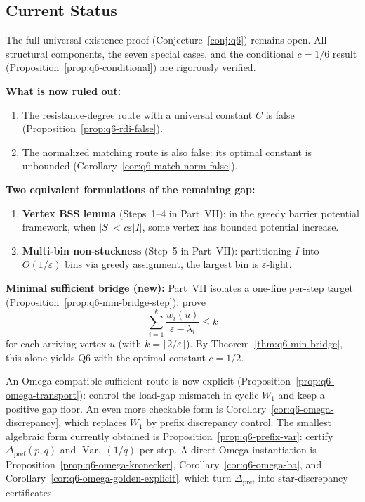 \subsection*{Current Status}
The full universal existence proof (Conjecture~\ref{conj:q6}) remains open.
All structural components, the seven special cases, and the
conditional $c=1/6$ result (Proposition~\ref{prop:q6-conditional})
are rigorously verified.

\medskip\noindent
\textbf{What is now ruled out:}
\begin{enumerate}[nosep]
\item The resistance-degree route with a universal constant
$C$ is false (Proposition~\ref{prop:q6-rdi-false}).
\item The normalized matching route is also false:
its optimal constant is unbounded (Corollary~\ref{cor:q6-match-norm-false}).
\end{enumerate}

\medskip\noindent
\textbf{Two equivalent formulations of the remaining gap:}
\begin{enumerate}[nosep]
\item \textbf{Vertex BSS lemma} (Steps~1--4 in Part~VII):
in the greedy barrier potential framework, when $|S|<c\varepsilon|I|$,
some vertex has bounded potential increase.
\item \textbf{Multi-bin non-stuckness} (Step~5 in Part~VII):
partitioning $I$ into $O(1/\varepsilon)$ bins via greedy assignment,
the largest bin is $\varepsilon$-light.
\end{enumerate}

\medskip\noindent
\textbf{Minimal sufficient bridge (new):}
Part~VII isolates a one-line per-step target
(Proposition~\ref{prop:q6-min-bridge-step}): prove
\[
\sum_{i=1}^k \frac{w_i(u)}{\varepsilon-\lambda_i}\le k
\]
for each arriving vertex $u$ (with $k=\lceil 2/\varepsilon\rceil$).
By Theorem~\ref{thm:q6-min-bridge}, this alone yields Q6 with the
optimal constant $c=1/2$.

An Omega-compatible sufficient route is now explicit
(Proposition~\ref{prop:q6-omega-transport}): control the
load-gap mismatch in cyclic $W_1$ and keep a positive gap floor.
An even more checkable form is Corollary~\ref{cor:q6-omega-discrepancy},
which replaces $W_1$ by prefix discrepancy control.
The smallest algebraic form currently obtained is
Proposition~\ref{prop:q6-prefix-var}: certify
\(\Delta_{\mathrm{pref}}(p,q)\) and
\(\operatorname{Var}_1(1/q)\) per step.
A direct Omega instantiation is
Proposition~\ref{prop:q6-omega-kronecker},
Corollary~\ref{cor:q6-omega-ba}, and
Corollary~\ref{cor:q6-omega-golden-explicit}, which turn
\(\Delta_{\mathrm{pref}}\) into star-discrepancy certificates.

